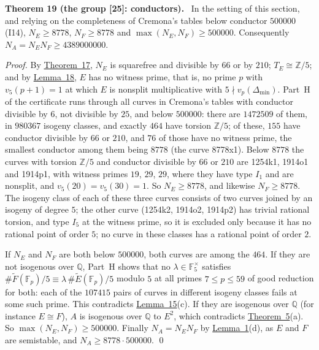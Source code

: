 \documentclass[11pt]{article}
\newenvironment{statement}[1]{\par\medskip\noindent\phantomsection\textbf{#1}\ }{\par\medskip}
\newcommand{\Q}{\mathbb Q}
\newcommand{\Z}{\mathbb Z}
\newcommand{\F}{\mathbb F}
\begin{document}
\begin{statement}{Theorem 19 (the group [25]: conductors).}\label{thm-25cond}
In the setting of this section, and relying on the completeness of Cremona's tables below conductor \(500000\)
(I14), \(N_E\ge8778\), \(N_F\ge8778\) and \(\max(N_E,N_F)\ge500000\). Consequently \(N_A=N_EN_F\ge4389000000\).
\end{statement}

\emph{Proof.} By \hyperref[thm-25]{Theorem~17}, \(N_E\) is squarefree and divisible by \(66\) or by \(210\); \(T_E
\cong\Z/5\); and by \hyperref[lemma-nonsplit]{Lemma~18}, \(E\) has no witness prime, that is, no prime \(p\) with
\(v_5(p+1)=1\) at which \(E\) is nonsplit multiplicative with \(5\nmid v_p(\Delta_{\min})\). Part~H of the certificate
runs through all curves in Cremona's tables with conductor divisible by \(6\), not divisible by \(25\), and below
\(500000\): there are \(1472509\) of them, in \(980367\) isogeny classes, and exactly \(464\) have torsion
\(\Z/5\); of these, \(155\) have conductor divisible by \(66\) or \(210\), and \(76\) of those have no witness prime,
the smallest conductor among them being \(8778\) (the curve 8778x1). Below \(8778\) the curves with torsion \(\Z/5\)
and conductor divisible by \(66\) or \(210\) are 1254k1, 1914o1 and 1914p1, with witness primes \(19\), \(29\),
\(29\), where they have type \(I_1\) and are nonsplit, and \(v_5(20)=v_5(30)=1\). So \(N_E\ge8778\), and likewise
\(N_F\ge8778\). The isogeny class of each of these three curves consists of two curves joined by an isogeny of
degree \(5\); the other curve (1254k2, 1914o2, 1914p2) has trivial rational torsion, and type \(I_5\) at the witness
prime, so it is excluded only because it has no rational point of order \(5\); no curve in these classes has a
rational point of order \(2\).

If \(N_E\) and \(N_F\) are both below \(500000\), both curves are among the \(464\). If they are not isogenous over
\(\Q\), Part~H shows that no \(\lambda\in\F_5^\times\) satisfies \(\#\widetilde F(\F_p)/5\equiv\lambda\,
\#\widetilde E(\F_p)/5\) modulo \(5\) at all primes \(7\le p\le59\) of good reduction for both: each of the \(107415\) pairs
of curves in different isogeny classes fails at some such prime. This contradicts
\hyperref[lemma-kummer]{Lemma~15}(c). If they are isogenous over \(\Q\) (for instance \(E\cong F\)), \(A\) is
isogenous over \(\Q\) to \(E^2\), which contradicts \hyperref[thm-isotypic]{Theorem~5}(a). So
\(\max(N_E,N_F)\ge500000\). Finally \(N_A=N_EN_F\) by \hyperref[lemma-gluing]{Lemma~1}(d), as \(E\) and \(F\) are
semistable, and \(N_A\ge8778\cdot500000\). \qed
\end{document}
